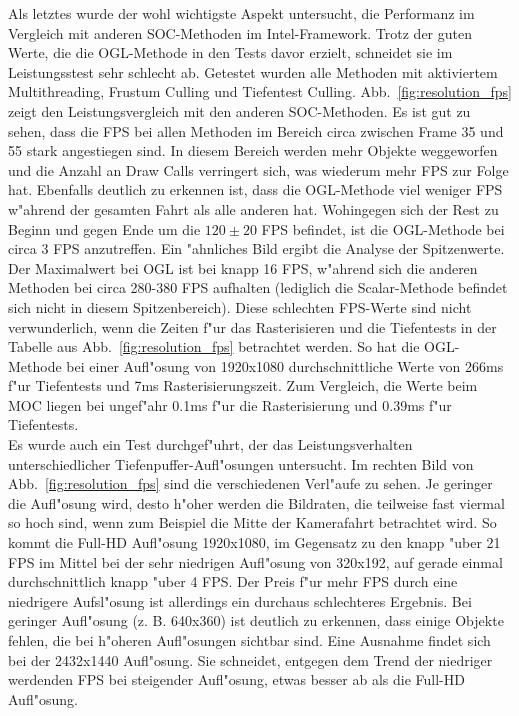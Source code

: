 \documentclass[journal]{vgtc}
\begin{document}
Als letztes wurde der wohl wichtigste Aspekt untersucht, die Performanz im Vergleich mit anderen SOC-Methoden im Intel-Framework.
Trotz der guten Werte, die die OGL-Methode in den Tests davor erzielt, schneidet sie im Leistungsstest sehr schlecht ab.
Getestet wurden alle Methoden mit aktiviertem Multithreading, Frustum Culling und Tiefentest Culling. Abb.\ \ref{fig:resolution_fps} zeigt den Leistungsvergleich mit den anderen SOC-Methoden.
Es ist gut zu sehen, dass die FPS bei allen Methoden im Bereich circa zwischen Frame 35 und 55 stark angestiegen sind.
In diesem Bereich werden mehr Objekte weggeworfen und die Anzahl an Draw Calls verringert sich, was wiederum mehr FPS zur Folge hat.
Ebenfalls deutlich zu erkennen ist, dass die OGL-Methode viel weniger FPS w"ahrend der gesamten Fahrt als alle anderen hat.
Wohingegen sich der Rest zu Beginn und gegen Ende um die $120\pm20$ FPS befindet, ist die OGL-Methode bei circa 3 FPS anzutreffen.
Ein "ahnliches Bild ergibt die Analyse der Spitzenwerte.
Der Maximalwert bei OGL ist bei knapp 16 FPS, w"ahrend sich die anderen Methoden bei circa 280-380 FPS aufhalten (lediglich die Scalar-Methode befindet sich nicht in diesem Spitzenbereich).
Diese schlechten FPS-Werte sind nicht verwunderlich, wenn die Zeiten f"ur das Rasterisieren und die Tiefentests in der Tabelle aus Abb.\ \ref{fig:resolution_fps} betrachtet werden.
So hat die OGL-Methode bei einer Aufl"osung von 1920x1080 durchschnittliche Werte von 266ms f"ur Tiefentests und 7ms Rasterisierungszeit.
Zum Vergleich, die Werte beim MOC liegen bei ungef"ahr 0.1ms f"ur die Rasterisierung und 0.39ms f"ur Tiefentests.\\

Es wurde auch ein Test durchgef"uhrt, der das Leistungsverhalten unterschiedlicher Tiefenpuffer-Aufl"osungen untersucht.
Im rechten Bild von Abb.\ \ref{fig:resolution_fps} sind die verschiedenen Verl"aufe zu sehen.
Je geringer die Aufl"osung wird, desto h"oher werden die Bildraten, die teilweise fast viermal so hoch sind, wenn zum Beispiel die Mitte der Kamerafahrt betrachtet wird.
So kommt die Full-HD Aufl"osung 1920x1080, im Gegensatz zu den knapp "uber 21 FPS im Mittel bei der sehr niedrigen Aufl"osung von 320x192, auf gerade einmal durchschnittlich knapp "uber 4 FPS. Der Preis f"ur mehr FPS durch eine niedrigere Aufsl"osung ist allerdings ein durchaus schlechteres Ergebnis.
Bei geringer Aufl"osung (z. B. 640x360) ist deutlich zu erkennen, dass einige Objekte fehlen, die bei h"oheren Aufl"osungen sichtbar sind.
Eine Ausnahme findet sich bei der 2432x1440 Aufl"osung.
Sie schneidet, entgegen dem Trend der niedriger werdenden FPS bei steigender Aufl"osung, etwas besser ab als die Full-HD Aufl"osung.\\
\end{document}
